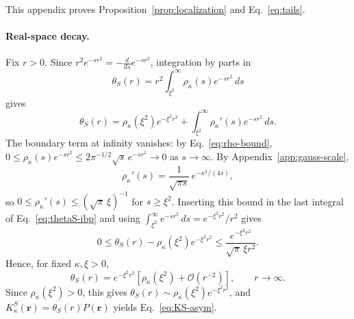\documentclass[11pt]{article}
\theoremstyle{plain}
\newcommand{\rr}{\bm r}
\newcommand{\PP}{P}
\DeclareRobustCommand{\_}{\textunderscore\allowbreak}
\begin{document}
This appendix proves Proposition~\ref{prop:localization} and
Eq.~\eqref{eq:tails}.

\paragraph{Real-space decay.}
Fix $r>0$. Since $r^2e^{-sr^2}=-\frac{d}{ds}e^{-sr^2}$, integration by parts
in
\begin{equation}
\theta_S(r)
=
r^2\int_{\xi^2}^{\infty}
\rho_\kappa(s)e^{-sr^2}\,ds
\end{equation}
gives
\begin{equation}
\label{eq:thetaS-ibp}
\theta_S(r)
=
\rho_\kappa(\xi^2)e^{-\xi^2r^2}
+
\int_{\xi^2}^{\infty}
\rho_\kappa'(s)e^{-sr^2}\,ds .
\end{equation}
The boundary term at infinity vanishes: by Eq.~\eqref{eq:rho-bound},
$0\le\rho_\kappa(s)e^{-sr^2}\le2\pi^{-1/2}\sqrt{s}\,e^{-sr^2}\to0$ as
$s\to\infty$. By Appendix~\ref{app:gauss-scale},
\begin{equation}
\rho_\kappa'(s)
=
\frac{1}{\sqrt{\pi s}}\,e^{-\kappa^2/(4s)},
\end{equation}
so $0\le\rho_\kappa'(s)\le(\sqrt{\pi}\,\xi)^{-1}$ for $s\ge\xi^2$. Inserting
this bound in the last integral of Eq.~\eqref{eq:thetaS-ibp} and using
$\int_{\xi^2}^\infty e^{-sr^2}\,ds=e^{-\xi^2r^2}/r^2$ gives
\begin{equation}
0
\le
\theta_S(r)-\rho_\kappa(\xi^2)e^{-\xi^2r^2}
\le
\frac{e^{-\xi^2r^2}}{\sqrt{\pi}\,\xi r^2} .
\end{equation}
Hence, for fixed $\kappa,\xi>0$,
\begin{equation}
\theta_S(r)
=
e^{-\xi^2r^2}
\left[\rho_\kappa(\xi^2)+\mathcal O(r^{-2})\right],
\qquad r\to\infty .
\end{equation}
Since $\rho_\kappa(\xi^2)>0$, this gives
$\theta_S(r)\sim\rho_\kappa(\xi^2)e^{-\xi^2r^2}$, and
$K_\kappa^S(\rr)=\theta_S(r)\PP(\rr)$ yields Eq.~\eqref{eq:KS-asym}.
\end{document}
